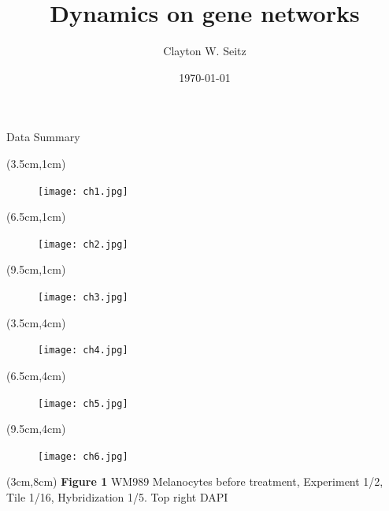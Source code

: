 \documentclass[aspectratio=1610]{beamer}					%
\title{Dynamics on gene networks}	%
\author{Clayton W. Seitz}								%
\date{\today}									%
\begin{document}
\begin{frame}
  \titlepage
\end{frame}

%

\begin{frame}{Data Summary}

\begin{textblock*}{3cm}(3.5cm,1cm)
\begin{figure}
\texttt{[image: ch1.jpg]}
\end{figure}
\end{textblock*}
\begin{textblock*}{3cm}(6.5cm,1cm)
\begin{figure}
\texttt{[image: ch2.jpg]}
\end{figure}
\end{textblock*}
\begin{textblock*}{3cm}(9.5cm,1cm)
\begin{figure}
\texttt{[image: ch3.jpg]}
\end{figure}
\end{textblock*}
\begin{textblock*}{3cm}(3.5cm,4cm)
\begin{figure}
\texttt{[image: ch4.jpg]}
\end{figure}
\end{textblock*}
\begin{textblock*}{3cm}(6.5cm,4cm)
\begin{figure}
\texttt{[image: ch5.jpg]}
\end{figure}
\end{textblock*}
\begin{textblock*}{3cm}(9.5cm,4cm)
\begin{figure}
\texttt{[image: ch6.jpg]}
\end{figure}
\end{textblock*}
\begin{textblock*}{10cm}(3cm,8cm)
\textbf{Figure 1} WM989 Melanocytes before treatment, Experiment 1/2, Tile 1/16, Hybridization 1/5. Top right DAPI
\end{textblock*}

\end{frame}
\end{document}
